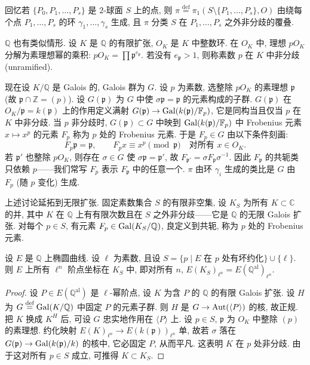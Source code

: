 回忆若 $\{P_0, P_1, \dots, P_s\}$ 是 $2$-球面 $S$ 上的点, 则 $\pi \overset{\text{def}}{=} \pi_1(S\setminus\{P_1, \dots, P_s\}, O)$ 由绕每个点 $P_1, \dots, P_s$ 的环 $\gamma_1, \dots, \gamma_s$ 生成, 且 $\pi$ 分类 $S$ 在 $P_1, \dots, P_s$ 之外非分歧的覆叠.

$\mathbb{Q}$ 也有类似情形. 设 $K$ 是 $\mathbb{Q}$ 的有限扩张, $O_K$ 是 $K$ 中整数环. 在 $O_K$ 中, 理想 $pO_K$ 分解为素理想幂的乘积: $pO_K = \prod\mathfrak{p}^{e_{\mathfrak{p}}}$. 若没有 $e_{\mathfrak{p}} > 1$, 则称素数 $p$ 在 $K$ 中非分歧 (unramified).

现在设 $K/\mathbb{Q}$ 是 Galois 的, Galois 群为 $G$. 设 $p$ 为素数, 选整除 $pO_K$ 的素理想 $\mathfrak{p}$ (故 $\mathfrak{p}\cap\mathbb{Z} = (p)$). 设 $G(\mathfrak{p})$ 为 $G$ 中使 $\sigma\mathfrak{p} = \mathfrak{p}$ 的元素构成的子群. $G(\mathfrak{p})$ 在 $O_K/\mathfrak{p} = k(\mathfrak{p})$ 上的作用定义满射 $G(\mathfrak{p})\to\operatorname{Gal}(k(\mathfrak{p})/\mathbb{F}_p)$, 它是同构当且仅当 $p$ 在 $K$ 中非分歧. 当 $p$ 非分歧时, $G(\mathfrak{p})\subset G$ 中映到 $\operatorname{Gal}(k(\mathfrak{p})/\mathbb{F}_p)$ 中 Frobenius 元素 $x\mapsto x^p$ 的元素 $F_p$ 称为 $p$ 处的 Frobenius 元素. 于是 $F_p\in G$ 由以下条件刻画:
\[
F_p\mathfrak{p} = \mathfrak{p}, \qquad F_p x \equiv x^p \pmod{\mathfrak{p}} \quad \text{对所有 } x\in O_K.
\]
若 $\mathfrak{p}'$ 也整除 $pO_K$, 则存在 $\sigma\in G$ 使 $\sigma\mathfrak{p} = \mathfrak{p}'$, 故 $F_{\mathfrak{p}'} = \sigma F_{\mathfrak{p}}\sigma^{-1}$. 因此 $F_{\mathfrak{p}}$ 的共轭类只依赖 $p$——我们常写 $F_p$ 表示 $F_{\mathfrak{p}}$ 中的任意一个. $\pi$ 由环 $\gamma_i$ 生成的类比是 $G$ 由 $F_p$ (随 $p$ 变化) 生成.

上述讨论延拓到无限扩张. 固定素数集合 $S$ 的有限非空集, 设 $K_S$ 为所有 $K\subset\mathbb{C}$ 的并, 其中 $K$ 在 $\mathbb{Q}$ 上有有限次数且在 $S$ 之外非分歧——它是 $\mathbb{Q}$ 的无限 Galois 扩张. 对每个 $p\in S$, 有元素 $F_p\in\operatorname{Gal}(K_S/\mathbb{Q})$, 良定义到共轭, 称为 $p$ 处的 Frobenius 元素.

\begin{proposition} \label{thm:5.8.1} 
设 $E$ 是 $\mathbb{Q}$ 上椭圆曲线. 设 $\ell$ 为素数, 且设 $S = \{p\mid E \text{ 在 } p \text{ 处有坏约化}\}\cup\{\ell\}$. 则 $E$ 上所有 $\ell^n$ 阶点坐标在 $K_S$ 中, 即对所有 $n$, $E(K_S)_{\ell^n} = E(\mathbb{Q}^{\mathrm{al}})_{\ell^n}$.
\end{proposition}

\begin{proof}
设 $P\in E(\mathbb{Q}^{\mathrm{al}})$ 是 $\ell$-幂阶点, 设 $K$ 为含 $P$ 的 $\mathbb{Q}$ 的有限 Galois 扩张. 设 $H$ 为 $G \overset{\text{def}}{=} \operatorname{Gal}(K/\mathbb{Q})$ 中固定 $P$ 的元素子群. 则 $H$ 是 $G\to\operatorname{Aut}(\langle P\rangle)$ 的核, 故正规. 把 $K$ 换成 $K^H$ 后, 可设 $G$ 忠实地作用在 $\langle P\rangle$ 上. 设 $p\in S$, $\mathfrak{p}$ 为 $O_K$ 中整除 $(p)$ 的素理想. 约化映射 $E(K)_{\ell^n}\to E(k(\mathfrak{p}))_{\ell^n}$ 单, 故若 $\sigma$ 落在 $G(\mathfrak{p})\to\operatorname{Gal}(k(\mathfrak{p})/k)$ 的核中, 它必固定 $P$, 从而平凡. 这表明 $K$ 在 $p$ 处非分歧. 由于这对所有 $p\in S$ 成立, 可推得 $K\subset K_S$.
\end{proof}

